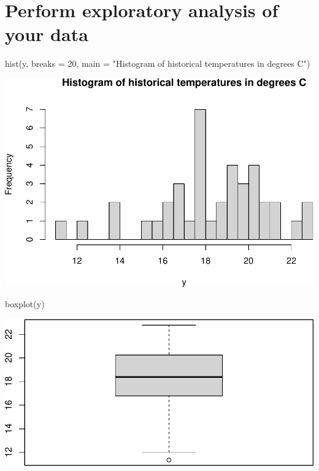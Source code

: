 \documentclass[
]{book}
\newenvironment{Shaded}{\begin{snugshade}}{\end{snugshade}}
\newcommand{\AttributeTok}[1]{\textcolor[rgb]{0.77,0.63,0.00}{#1}}
\newcommand{\DecValTok}[1]{\textcolor[rgb]{0.00,0.00,0.81}{#1}}
\newcommand{\FunctionTok}[1]{\textcolor[rgb]{0.00,0.00,0.00}{#1}}
\newcommand{\NormalTok}[1]{#1}
\newcommand{\StringTok}[1]{\textcolor[rgb]{0.31,0.60,0.02}{#1}}
\begin{document}
\hypertarget{perform-exploratory-analysis-of-your-data}{%
\section{Perform exploratory analysis of your data}\label{perform-exploratory-analysis-of-your-data}}

\begin{Shaded}
\begin{Highlighting}[]
\FunctionTok{hist}\NormalTok{(y, }\AttributeTok{breaks =} \DecValTok{20}\NormalTok{, }\AttributeTok{main =} \StringTok{"Histogram of historical temperatures in degrees C"}\NormalTok{)}
\end{Highlighting}
\end{Shaded}

\includegraphics{graphics/unnamed-chunk-4-1.pdf}

\begin{Shaded}
\begin{Highlighting}[]
\FunctionTok{boxplot}\NormalTok{(y)}
\end{Highlighting}
\end{Shaded}

\includegraphics{graphics/unnamed-chunk-5-1.pdf}
\end{document}
